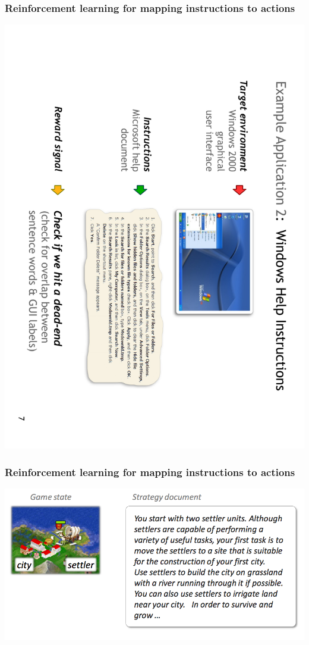 \documentclass[ignorenonframetext]{beamer}
\begin{document}
\begin{frame}\frametitle{Reinforcement learning for mapping instructions to actions}
\begin{center}
\href{http://groups.csail.mit.edu/rbg/code/rl-hli}{
\includegraphics[angle=90,width=\textwidth]{images/branavan-windows.pdf}}
\end{center}
\end{frame}

\begin{frame}\frametitle{Reinforcement learning for mapping instructions to actions}
\begin{center}
\href{http://groups.csail.mit.edu/rbg/code/civ}{
\includegraphics[width=\textwidth]{images/branavan-civ.png}}
\end{center}
\end{frame}
\end{document}
